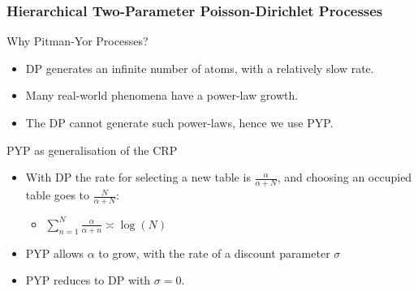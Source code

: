\documentclass{beamer}
\begin{document}
\begin{frame}
    \frametitle{\normalsize Hierarchical Two-Parameter Poisson-Dirichlet Processes}

    \begin{block}{Why Pitman-Yor Processes?}
        \begin{itemize}
            \item DP generates an infinite number of atoms, with a relatively slow rate.
            \item Many real-world phenomena have a power-law growth.
            \item The DP cannot generate such power-laws, hence we use PYP.
        \end{itemize}
    \end{block}

    \begin{block}{PYP as generalisation of the CRP}
        \begin{itemize}
            \item With DP the rate for selecting a new table is $\frac{\alpha}{\alpha+N}$, and choosing an occupied table goes to $\frac{N}{\alpha+N}$:
            \begin{itemize}
                \item $\sum_{n=1}^N\frac{\alpha}{\alpha+n}\asymp\log(N)$
            \end{itemize}
            \item PYP allows $\alpha$ to grow, with the rate of a discount parameter $\sigma$
            \item PYP reduces to DP with $\sigma=0$.
        \end{itemize}
    \end{block}
    
\end{frame}
\end{document}
